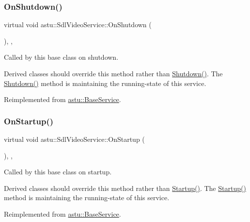 \subsubsection{\texorpdfstring{On\+Shutdown()}{OnShutdown()}}
{\footnotesize\ttfamily virtual void astu\+::\+Sdl\+Video\+Service\+::\+On\+Shutdown (\begin{DoxyParamCaption}{ }\end{DoxyParamCaption})\hspace{0.3cm}{\ttfamily [override]}, {\ttfamily [protected]}, {\ttfamily [virtual]}}

Called by this base class on shutdown.

Derived classes should override this method rather than {\ttfamily \hyperlink{classastu_1_1BaseService_a7095888244052db294d58738c0d187fb}{Shutdown()}}. The {\ttfamily \hyperlink{classastu_1_1BaseService_a7095888244052db294d58738c0d187fb}{Shutdown()}} method is maintaining the running-\/state of this service. 

Reimplemented from \hyperlink{classastu_1_1BaseService_aeb5003f7c5efe5412725ac4c66942d03}{astu\+::\+Base\+Service}.

\mbox{\label{classastu_1_1SdlVideoService_add229ac2af59a4aea090e4de4c67e530}} 
\subsubsection{\texorpdfstring{On\+Startup()}{OnStartup()}}
{\footnotesize\ttfamily virtual void astu\+::\+Sdl\+Video\+Service\+::\+On\+Startup (\begin{DoxyParamCaption}{ }\end{DoxyParamCaption})\hspace{0.3cm}{\ttfamily [override]}, {\ttfamily [protected]}, {\ttfamily [virtual]}}

Called by this base class on startup.

Derived classes should override this method rather than {\ttfamily \hyperlink{classastu_1_1BaseService_a59dade033dcb44dd32155c526a3a58e2}{Startup()}}. The {\ttfamily \hyperlink{classastu_1_1BaseService_a59dade033dcb44dd32155c526a3a58e2}{Startup()}} method is maintaining the running-\/state of this service. 

Reimplemented from \hyperlink{classastu_1_1BaseService_ac8710cd2d6dcc990db65e7c8ccfbc5ff}{astu\+::\+Base\+Service}.

